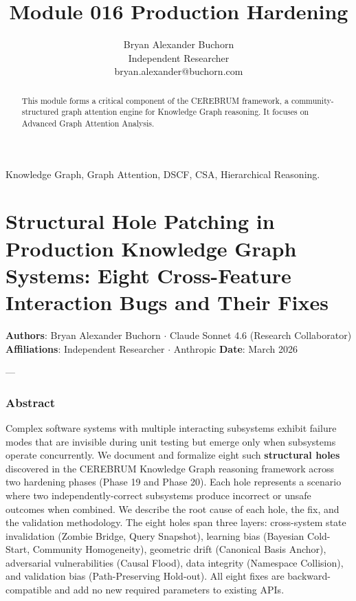 \documentclass[10pt,journal,compsoc]{IEEEtran}
\begin{document}
\title{Module 016 Production Hardening}
\author{Bryan Alexander Buchorn \\ Independent Researcher \\ bryan.alexander@buchorn.com}

\maketitle

\begin{abstract}
This module forms a critical component of the CEREBRUM framework, a community-structured graph attention engine for Knowledge Graph reasoning. It focuses on Advanced Graph Attention Analysis.
\end{abstract}

\begin{IEEEkeywords}
Knowledge Graph, Graph Attention, DSCF, CSA, Hierarchical Reasoning.
\end{IEEEkeywords}

\section{Structural Hole Patching in Production Knowledge Graph Systems: Eight Cross-Feature Interaction Bugs and Their Fixes}

\textbf{Authors}: Bryan Alexander Buchorn $\cdot$ Claude Sonnet 4.6 (Research Collab\-orator)
\textbf{Affili\-ations}: Independent Researcher $\cdot$ Anthropic
\textbf{Date}: March 2026

---

\subsubsection{Abstract}
Complex software systems with multiple interacting subsystems exhibit failure modes that are invisible during unit testing but emerge only when subsystems operate concu\-rrently. We document and formalize eight such \textbf{structural holes} discovered in the CEREBRUM Knowledge Graph reasoning framework across two hardening phases (Phase 19 and Phase 20). Each hole represents a scenario where two indep\-endently-correct subsystems produce incorrect or unsafe outcomes when combined. We describe the root cause of each hole, the fix, and the validation methodology. The eight holes span three layers: cross-system state inval\-idation (Zombie Bridge, Query Snapshot), learning bias (Bayesian Cold-Start, Community Homogeneity), geometric drift (Canonical Basis Anchor), adversarial vulne\-rabilities (Causal Flood), data integrity (Namespace Collision), and validation bias (Path-Preserving Hold-out). All eight fixes are backward-compatible and add no new required parameters to existing APIs.
\end{document}
